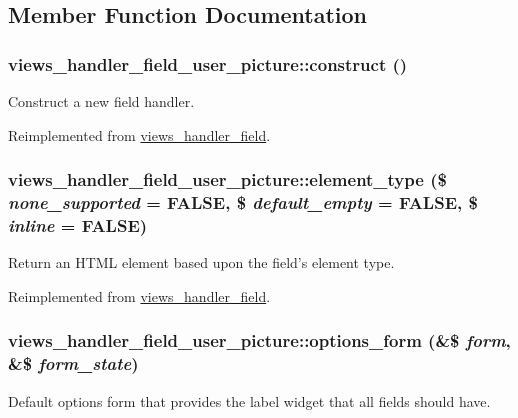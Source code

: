 \subsection{Member Function Documentation}
\hypertarget{classviews__handler__field__user__picture_a65f7bf025afe7e60df88cfe9a72eaf4a}{
\subsubsection[{construct}]{\setlength{\rightskip}{0pt plus 5cm}views\_\-handler\_\-field\_\-user\_\-picture::construct ()}}
\label{classviews__handler__field__user__picture_a65f7bf025afe7e60df88cfe9a72eaf4a}
Construct a new field handler. 

Reimplemented from \hyperlink{classviews__handler__field_a3d50050864c255b71c842972a45d39f6}{views\_\-handler\_\-field}.\hypertarget{classviews__handler__field__user__picture_aa6bb83c59c2ef592545cbdf9a41f9878}{
\subsubsection[{element\_\-type}]{\setlength{\rightskip}{0pt plus 5cm}views\_\-handler\_\-field\_\-user\_\-picture::element\_\-type (\$ {\em none\_\-supported} = {\ttfamily FALSE}, \/  \$ {\em default\_\-empty} = {\ttfamily FALSE}, \/  \$ {\em inline} = {\ttfamily FALSE})}}
\label{classviews__handler__field__user__picture_aa6bb83c59c2ef592545cbdf9a41f9878}
Return an HTML element based upon the field's element type. 

Reimplemented from \hyperlink{classviews__handler__field_a80ea5743144a8608145eb22d23a23d90}{views\_\-handler\_\-field}.\hypertarget{classviews__handler__field__user__picture_a44c8350ed38c78e221297850e8235692}{
\subsubsection[{options\_\-form}]{\setlength{\rightskip}{0pt plus 5cm}views\_\-handler\_\-field\_\-user\_\-picture::options\_\-form (\&\$ {\em form}, \/  \&\$ {\em form\_\-state})}}
\label{classviews__handler__field__user__picture_a44c8350ed38c78e221297850e8235692}
Default options form that provides the label widget that all fields should have. 

